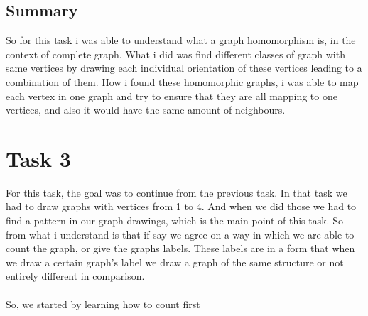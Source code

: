 \documentclass{Assignment}
\begin{document}
\subsection*{Summary}
So for this task i was able to understand what a graph homomorphism is, in the context of complete graph. What i did was find different classes of graph with same vertices by drawing each individual orientation of these vertices leading to a combination of them. How i found these homomorphic graphs, i was able to map each vertex in one graph and try to ensure that they are all mapping to one vertices, and also it would have the same amount of neighbours.\newpage
\section*{Task 3} 
For this task, the goal was to continue from the previous task. In that task we had to draw graphs with vertices from 1 to 4. And when we did those we had to find a pattern in our graph drawings, which is the main point of this task. So from what i understand is that if say we agree on a way in which we are able to count the graph, or give the graphs labels. These labels are in a form that when we draw a certain graph's label we draw a graph of the same structure or not entirely different in comparison.\\\\
So, we started by learning how to count first 




\end{document}
